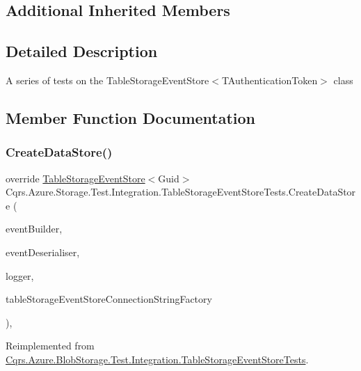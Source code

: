 \subsection*{Additional Inherited Members}


\subsection{Detailed Description}
A series of tests on the Table\+Storage\+Event\+Store$<$\+T\+Authentication\+Token$>$ class 



\subsection{Member Function Documentation}
\mbox{\label{classCqrs_1_1Azure_1_1Storage_1_1Test_1_1Integration_1_1TableStorageEventStoreTests_a4e143d134a156e2ab0d044d7f6f15b5d_a4e143d134a156e2ab0d044d7f6f15b5d}} 
\subsubsection{\texorpdfstring{Create\+Data\+Store()}{CreateDataStore()}}
{\footnotesize\ttfamily override \hyperlink{classCqrs_1_1Azure_1_1BlobStorage_1_1Events_1_1TableStorageEventStore}{Table\+Storage\+Event\+Store}$<$Guid$>$ Cqrs.\+Azure.\+Storage.\+Test.\+Integration.\+Table\+Storage\+Event\+Store\+Tests.\+Create\+Data\+Store (\begin{DoxyParamCaption}\item[{\hyperlink{interfaceCqrs_1_1Events_1_1IEventBuilder}{I\+Event\+Builder}$<$ Guid $>$}]{event\+Builder,  }\item[{\hyperlink{interfaceCqrs_1_1Events_1_1IEventDeserialiser}{I\+Event\+Deserialiser}$<$ Guid $>$}]{event\+Deserialiser,  }\item[{I\+Logger}]{logger,  }\item[{\hyperlink{interfaceCqrs_1_1Azure_1_1BlobStorage_1_1ITableStorageStoreConnectionStringFactory}{I\+Table\+Storage\+Store\+Connection\+String\+Factory}}]{table\+Storage\+Event\+Store\+Connection\+String\+Factory }\end{DoxyParamCaption})\hspace{0.3cm}{\ttfamily [protected]}, {\ttfamily [virtual]}}



Reimplemented from \hyperlink{classCqrs_1_1Azure_1_1BlobStorage_1_1Test_1_1Integration_1_1TableStorageEventStoreTests_aa2b40be10577126372049c14fd951e17_aa2b40be10577126372049c14fd951e17}{Cqrs.\+Azure.\+Blob\+Storage.\+Test.\+Integration.\+Table\+Storage\+Event\+Store\+Tests}.

